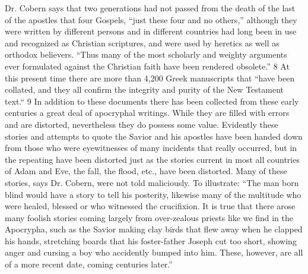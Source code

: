 Dr. Cobern says that two generations had not passed from the death of the last of the apostles
that four Gospels, ``just these four and no others,'' although they were written by different
persons and in different countries had long been in use and recognized as Christian
scriptures, and were used by heretics as well as orthodox believers. ``Thus many of the most
scholarly and weighty arguments ever formulated against the Christian faith have been
rendered obsolete.'' 8 At this present time there are more than 4,200 Greek manuscripts that
``have been collated, and they all confirm the integrity and purity of the New Testament text.``
9 In addition to these documents there has been collected from these early centuries a great
deal of apocryphal writings. While they are filled with errors and are distorted, nevertheless
they do possess some value. Evidently these stories and attempts to quote the Savior and his
apostles have been handed down from those who were eyewitnesses of many incidents that
really occurred, but in the repeating have been distorted just as the stories current in most all
countries of Adam and Eve, the fall, the flood, etc., have been distorted. Many of these
stories, says Dr. Cobern, were not told maliciously. To illustrate: ``The man born blind would
have a story to tell his posterity, likewise many of the multitude who were healed, blessed or
who witnessed the crucifixion. It is true that there arose many foolish stories coming largely
from over-zealous priests like we find in the Apocrypha, such as the Savior making clay
birds that flew away when he clapped his hands, stretching boards that his foster-father
Joseph cut too short, showing anger and cursing a boy who accidently bumped into him.
These, however, are all of a more recent date, coming centuries later.''


